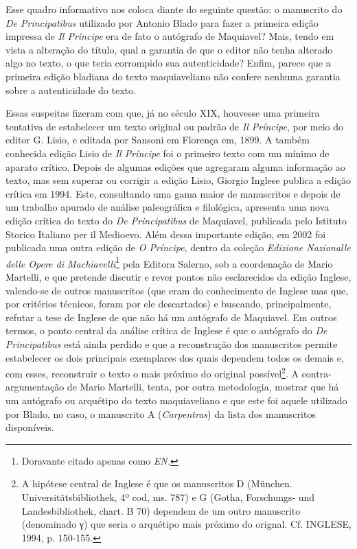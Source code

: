 Esse quadro informativo nos coloca diante do seguinte questão: o
manuscrito do \emph{De Principatibus} utilizado por Antonio Blado para
fazer a primeira edição impressa de \emph{Il Príncipe} era de fato o
autógrafo de Maquiavel? Mais, tendo em vista a alteração do título, qual
a garantia de que o editor não tenha alterado algo no texto, o que teria
corrompido sua autenticidade? Enfim, parece que a primeira edição
bladiana do texto maquiaveliano não confere nenhuma garantia sobre a
autenticidade do texto.

Essas suspeitas fizeram com que, já no século XIX, houvesse uma primeira
tentativa de estabelecer um texto original ou padrão de \emph{Il
Príncipe}, por meio do editor G. Lisio, e editada por Sansoni em
Florença em, 1899. A também conhecida edição Lisio de \emph{Il Príncipe}
foi o primeiro texto com um mínimo de aparato crítico. Depois de algumas
edições que agregaram alguma informação ao texto, mas sem superar ou
corrigir a edição Lisio, Giorgio Inglese publica a edição crítica em
1994. Este, consultando uma gama maior de manuscritos e depois de um
trabalho apurado de análise paleográfica e filológica, apresenta uma
nova edição crítica do texto do \emph{De Principatibus} de Maquiavel,
publicada pelo Istituto Storico Italiano per il Medioevo. Além dessa
importante edição, em 2002 foi publicada uma outra edição de \emph{O
Príncipe}, dentro da coleção \emph{Edizione Nazionalle delle Opere di
Machiavelli}\footnote{Doravante citado apenas como \emph{EN.}} pela
Editora Salerno, sob a coordenação de Mario Martelli, e que pretende
discutir e rever pontos não esclarecidos da edição Inglese, valendo-se
de outros manuscritos (que eram do conhecimento de Inglese mas que, por
critérios técnicos, foram por ele descartados) e buscando,
principalmente, refutar a tese de Inglese de que não há um autógrafo de
Maquiavel. Em outros termos, o ponto central da análise crítica de
Inglese é que o autógrafo do \emph{De Principatibus} está ainda perdido
e que a reconstrução dos manuscritos permite estabelecer os dois
principais exemplares dos quais dependem todos os demais e, com esses,
reconstruir o texto o mais próximo do original possível\footnote{A
  hipótese central de Inglese é que os manuscritos D (München.
  Universitätsbibliothek, 4º cod, ms. 787) e G (Gotha, Forschungs- und
  Landesbibliothek, chart. B 70) dependem de um outro manuscrito
  (denominado γ) que seria o arquétipo mais próximo do orignal. Cf.
  INGLESE, 1994, p. 150-155.}. A contra-argumentação de Mario Martelli,
tenta, por outra metodologia, mostrar que há um autógrafo ou arquétipo
do texto maquiaveliano e que este foi aquele utilizado por Blado, no
caso, o manuscrito A (\emph{Carpentras}) da lista dos manuscritos
disponíveis.

